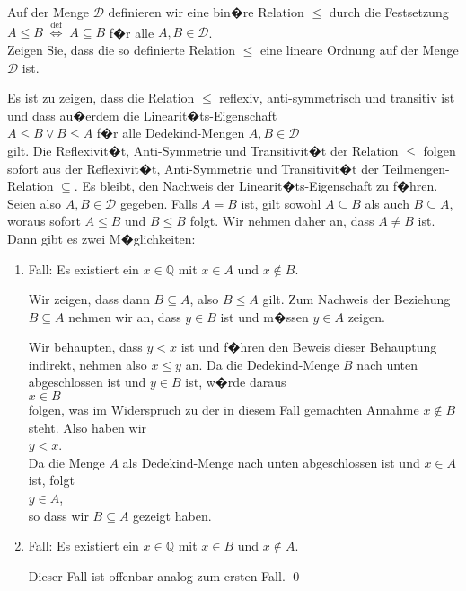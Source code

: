 \exercise
Auf der Menge $\mathcal{D}$ definieren wir eine bin�re Relation $\leq$ durch die Festsetzung
\\[0.2cm]
\hspace*{1.3cm}
$A \leq B \;\stackrel{\mathrm{def}}{\Longleftrightarrow}\; A \subseteq B$ \quad f�r alle $A,B \in \mathcal{D}$.
\\[0.2cm]
Zeigen Sie, dass die so definierte Relation $\leq$ eine lineare Ordnung auf der Menge $\mathcal{D}$ ist.

\solution
Es ist zu zeigen, dass die Relation $\leq$ reflexiv, anti-symmetrisch und transitiv ist und dass au�erdem die Linearit�ts-Eigenschaft
\\[0.2cm]
\hspace*{1.3cm} $A \leq B \vee B \leq A$ \quad f�r alle Dedekind-Mengen $A,B \in \mathcal{D}$
\\[0.2cm]
gilt.  Die Reflexivit�t, Anti-Symmetrie und Transitivit�t der Relation $\leq$ folgen sofort aus der Reflexivit�t,
Anti-Symmetrie und Transitivit�t der Teilmengen-Relation $\subseteq$.  Es bleibt, den Nachweis der
Linearit�ts-Eigenschaft zu f�hren.  Seien also $A,B \in \mathcal{D}$ gegeben.  Falls $A = B$ ist, gilt sowohl
$A \subseteq B$ als auch $B \subseteq A$, woraus sofort $A \leq B$ und $B \leq B$ folgt.  Wir nehmen
daher an, dass $A \not= B$ ist.  Dann gibt es zwei M�glichkeiten:
\begin{enumerate}
\item Fall: Es existiert ein $x \in \mathbb{Q}$ mit $x \in A$ und $x \not\in B$.

            Wir zeigen, dass dann $B \subseteq A$, also $B \leq A$ gilt.  Zum Nachweis der Beziehung
            $B \subseteq A$ nehmen wir an, dass $y \in B$ ist und m�ssen $y \in A$ zeigen.

            Wir behaupten, dass $y < x$ ist und f�hren den Beweis dieser Behauptung indirekt, nehmen also
            $x \leq y$ an.  Da die Dedekind-Menge $B$ nach unten abgeschlossen ist und $y \in B$ ist, w�rde daraus
            \\[0.2cm]
            \hspace*{1.3cm}
            $x \in B$
            \\[0.2cm]
            folgen, was im Widerspruch zu der in diesem Fall gemachten Annahme $x \not\in B$ steht.  Also
            haben wir
            \\[0.2cm]
            \hspace*{1.3cm}
            $y < x$.
            \\[0.2cm]
            Da die Menge $A$ als Dedekind-Menge nach unten abgeschlossen ist und $x \in A$ ist, folgt
            \\[0.2cm]
            \hspace*{1.3cm}
            $y \in A$,
            \\[0.2cm]
            so dass wir $B \subseteq A$ gezeigt haben.
\item Fall: Es existiert ein $x \in \mathbb{Q}$ mit $x \in B$ und $x \not\in A$.

            Dieser Fall ist offenbar analog zum ersten Fall.
            \qed
\end{enumerate}


